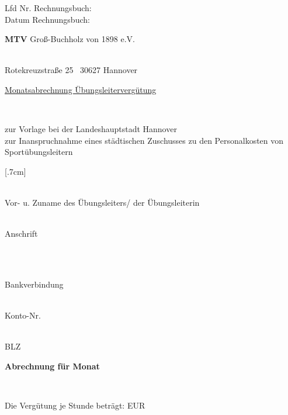 \documentclass[a4paper,10pt,BCOR=0mm]{scrreprt}
\begin{document}
\begin{flushright}
\parbox{6cm}{Lfd Nr. Rechnungsbuch: \hrulefill \\
Datum Rechnungsbuch: \hrulefill }
\end{flushright}
\begin{center}
\begin{Large}\textbf{MTV} Groß-Buchholz von 1898 e.V.                                        \end{Large}\\
Rotekreuzstraße 25 \textperiodcentered\ 30627 Hannover\\[.4cm]
\begin{huge}\underline{Monatsabrechnung Übungsleitervergütung}\end{huge}\\
\begin{scriptsize}zur Vorlage bei der Landeshauptstadt Hannover\\
zur Inanspruchnahme eines städtischen Zuschusses zu den Personalkosten von Sportübungsleitern
\end{scriptsize}
[.7cm]
\parbox{0,49\textwidth}{
\begin{center}
\hrulefill\hrulefill\hrulefill\hrulefill\\
Vor- u. Zuname des Übungsleiters/ der Übungsleiterin
\end{center}
}
\hfill
\parbox{0,49\textwidth}{\begin{center}
\hrulefill\hrulefill\hrulefill\hrulefill\\
Anschrift\end{center}}\\[.7cm]
\parbox{0,32\textwidth}{
\begin{center}
\hrulefill\hrulefill\hrulefill\hrulefill\\
Bankverbindung
\end{center}
}
\hfill
\parbox{0,32\textwidth}{
\begin{center}
\hrulefill\hrulefill\hrulefill\hrulefill\\
Konto-Nr.
\end{center}
}
\hfill
\parbox{0,32\textwidth}{
\begin{center}
\hrulefill\hrulefill\hrulefill\hrulefill\\
BLZ
\end{center}
}
\parbox{12cm}{\begin{large}\textbf{Abrechnung für Monat \hrulefill}\end{large}}\\
\parbox{9cm}{Die Vergütung je Stunde beträgt: \hfill EUR}
\end{center}\begin{flushright}


\end{flushright}
\end{document}
